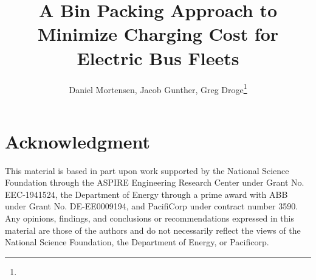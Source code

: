 \documentclass[lettersize,journal]{IEEEtran}
\begin{document}
\title{A Bin Packing Approach to Minimize Charging Cost for Electric Bus Fleets}
\author{Daniel Mortensen, Jacob Gunther, Greg Droge\thanks{}}

%
{}

\maketitle 








\section*{Acknowledgment}This material is based in part upon work supported by the National Science Foundation through the ASPIRE Engineering Research Center under Grant No. EEC-1941524, the Department of Energy through a prime award with ABB under Grant No. DE-EE0009194, and PacifiCorp under contract number 3590. Any opinions, findings, and conclusions or recommendations expressed in this material are those of the authors and do not necessarily reflect the views of the National Science Foundation, the Department of Energy, or Pacificorp.
\printbibliography
\end{document}
